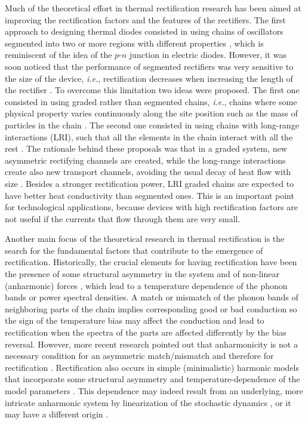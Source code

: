 Much of the theoretical effort in thermal rectification research has been aimed at improving the rectification factors and the features of the rectifiers. The first approach to designing thermal diodes consisted in using chains of oscillators segmented into two or more regions with different properties \cite{Terraneo2002,Li2004,Li2008,Hu2006}, which is reminiscent of the idea of the $p$-$n$ junction in electric diodes. However, it was soon noticed that the performance of segmented rectifiers was very sensitive to the size of the device, \textit{i.e.}, rectification decreases when increasing the length of the rectifier \cite{Hu2006}. To overcome this limitation two ideas were proposed. The first one consisted in using graded rather than segmented chains, \textit{i.e.}, chains where some physical property varies continuously along the site position such as the mass of particles in the chain \cite{Wang2012,Chen2015,Romero-Bastida2017,Yang2007,Romero-Bastida2013,Dettori2016,Pereira2010,Pereira2011,Avila2013}. The second one consisted in using chains with long-range interactions (LRI), such that all the elements in the chain interact with all the rest \cite{Chen2015,Bagchi2017,Pereira2013}. The rationale behind these proposals was that in a graded system, new asymmetric rectifying channels are created, while the long-range interactions create
also new transport channels, avoiding the usual decay of heat flow with size \cite{Chen2015}. Besides a stronger rectification power, LRI graded chains are expected to have better heat conductivity than segmented ones. This is an important point for technological applications, because devices with high rectification factors are not useful if the currents that flow through them are very small.

Another main focus of the theoretical research in thermal rectification is the search for the fundamental factors that contribute to the emergence of rectification. Historically, the crucial elements for having rectification have been the presence of some structural asymmetry in the system and of non-linear (anharmonic) forces \cite{Zeng2008,Katz2016,Li2008,Hu2006,Benenti2016,Li2012,Segal2005,Segal2005b}, which lead to a temperature dependence of the phonon bands or power spectral densities. A match or mismatch of the phonon bands of neighboring parts of the chain implies corresponding good or bad conduction so the
sign of the temperature bias may affect the conduction and lead to rectification when the spectra of the parts are affected differently by the bias reversal. However, more recent research pointed out that anharmonicity is not a necessary condition for an asymmetric match/mismatch and therefore for rectification \cite{Pereira2017}. Rectification also occurs in simple (minimalistic) harmonic models that incorporate some structural asymmetry and temperature-dependence of the model parameters \cite{Pereira2017}. This dependence may indeed result from an underlying, more intricate  anharmonic system by linearization of the stochastic dynamics \cite{Pereira2017,Pereira2019}, or it may have a different origin \cite{Simon2019}.


